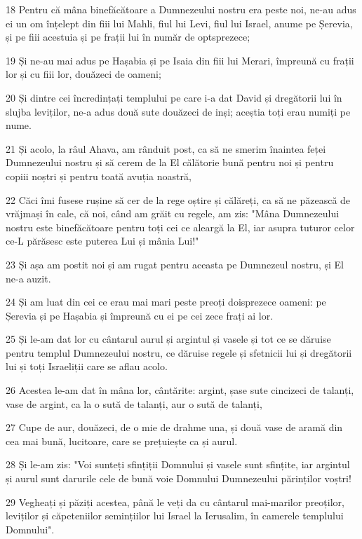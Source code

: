 \par 18 Pentru că mâna binefăcătoare a Dumnezeului nostru era peste noi, ne-au adus ei un om înțelept din fiii lui Mahli, fiul lui Levi, fiul lui Israel, anume pe Șerevia, și pe fiii acestuia și pe frații lui în număr de optsprezece;
\par 19 Și ne-au mai adus pe Hașabia și pe Isaia din fiii lui Merari, împreună cu frații lor și cu fiii lor, douăzeci de oameni;
\par 20 Și dintre cei încredințați templului pe care i-a dat David și dregătorii lui în slujba leviților, ne-a adus două sute douăzeci de inși; aceștia toți erau numiți pe nume.
\par 21 Și acolo, la râul Ahava, am rânduit post, ca să ne smerim înaintea feței Dumnezeului nostru și să cerem de la El călătorie bună pentru noi și pentru copiii noștri și pentru toată avuția noastră,
\par 22 Căci îmi fusese rușine să cer de la rege oștire și călăreți, ca să ne păzească de vrăjmași în cale, că noi, când am grăit cu regele, am zis: "Mâna Dumnezeului nostru este binefăcătoare pentru toți cei ce aleargă la El, iar asupra tuturor celor ce-L părăsesc este puterea Lui și mânia Lui!"
\par 23 Și așa am postit noi și am rugat pentru aceasta pe Dumnezeul nostru, și El ne-a auzit.
\par 24 Și am luat din cei ce erau mai mari peste preoți doisprezece oameni: pe Șerevia și pe Hașabia și împreună cu ei pe cei zece frați ai lor.
\par 25 Și le-am dat lor cu cântarul aurul și argintul și vasele și tot ce se dăruise pentru templul Dumnezeului nostru, ce dăruise regele și sfetnicii lui și dregătorii lui și toți Israeliții care se aflau acolo.
\par 26 Acestea le-am dat în mâna lor, cântărite: argint, șase sute cincizeci de talanți, vase de argint, ca la o sută de talanți, aur o sută de talanți,
\par 27 Cupe de aur, douăzeci, de o mie de drahme una, și două vase de aramă din cea mai bună, lucitoare, care se prețuiește ca și aurul.
\par 28 Și le-am zis: "Voi sunteți sfințiții Domnului și vasele sunt sfințite, iar argintul și aurul sunt darurile cele de bună voie Domnului Dumnezeului părinților voștri!
\par 29 Vegheați și păziți acestea, până le veți da cu cântarul mai-marilor preoților, leviților și căpeteniilor semințiilor lui Israel la Ierusalim, în camerele templului Domnului".
